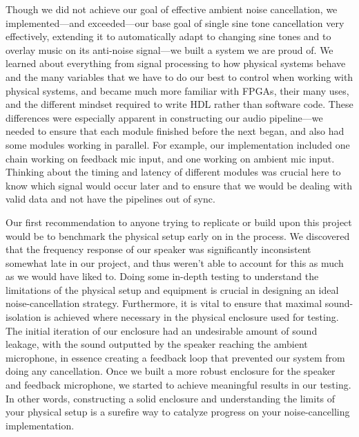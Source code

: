 \documentclass{fpgairpods}
\begin{document}

Though we did not achieve our goal of effective ambient noise cancellation, we implemented---and exceeded---our base goal of single sine tone cancellation very effectively, extending it to automatically adapt to changing sine tones and to overlay music on its anti-noise signal---we built a system we are proud of. We learned about everything from signal processing to how physical systems behave and the many variables that we have to do our best to control when working with physical systems, and became much more familiar with FPGAs, their many uses, and the different mindset required to write HDL rather than software code. These differences were especially apparent in constructing our audio pipeline---we needed to ensure that each module finished before the next began, and also had some modules working in parallel. For example, our implementation included one chain working on feedback mic input, and one working on ambient mic input. Thinking about the timing and latency of different modules was crucial here to know which  signal would occur later and to ensure that we would be dealing with valid data and not have the pipelines out of sync. 



Our first recommendation to anyone trying to replicate or build upon this project would be to benchmark the physical setup early on in the process. We discovered that the frequency response of our speaker was significantly inconsistent somewhat late in our project, and thus weren't able to account for this as much as we would have liked to. Doing some in-depth testing to understand the limitations of the physical setup and equipment is crucial in designing an ideal noise-cancellation strategy. Furthermore, it is vital to ensure that maximal sound-isolation is achieved where necessary in the physical enclosure used for testing. The initial iteration of our enclosure had an undesirable amount of sound leakage, with the sound outputted by the speaker reaching the ambient microphone, in essence creating a feedback loop that prevented our system from doing any cancellation. Once we built a more robust enclosure for the speaker and feedback microphone, we started to achieve meaningful results in our testing. In other words, constructing a solid enclosure and understanding the limits of your physical setup is a surefire way to catalyze progress on your noise-cancelling implementation.
\end{document}
